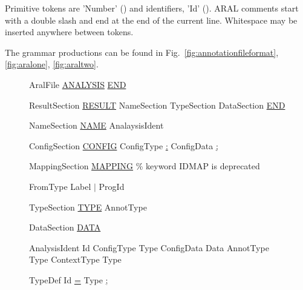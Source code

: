{Primitive tokens are 'Number' () and identifiers, 'Id' ().
ARAL comments start with a double slash and end at the end of the current line. Whitespace may be inserted anywhere between tokens.

The grammar productions can be found in Fig.~\ref{fig:annotationfileformat},\ref{fig:aralone}, \ref{fig:araltwo}.

\begin{figure}[!ht]
\begin{GRAMMAR}
{AralFile}      \>\>\>\>\>\garrow\> \underline{ANALYSIS} 
                 \>\>\>\>\> \> 
                 \>\>\>\>\> \>  
                 \>\>\>\>\> \>  
                 \>\>\>\>\> \>       \underline{END}

{ResultSection}    \>\>\>\>\>\garrow\> \underline{RESULT}
                 \>\>\>\>\> \> NameSection
                 \>\>\>\>\> \> TypeSection 
                 \>\>\>\>\> \> DataSection 
                 \>\>\>\>\> \> \underline{END}

{NameSection}    \>\>\>\>\>\garrow\> \underline{NAME} AnalaysisIdent

{ConfigSection}  \>\>\>\>\>\garrow\> \underline{CONFIG} ConfigType \underline{:} ConfigData \underline{;}

{MappingSection}  \>\>\>\>\>\>\garrow\> \underline{MAPPING}  
                  \>\>\>\>\>\>\% keyword IDMAP is deprecated

{FromType}       \>\>\>\>\>\garrow\> Label
                 \>\>\>\>\> \> $\mid$ ProgId

{TypeSection}    \>\>\>\>\>\garrow\> \underline{TYPE}   AnnotType 

{DataSection}    \>\>\>\>\>\garrow\> \underline{DATA} 

{AnalysisIdent}  \>\>\>\>\>\garrow\> Id
{ConfigType}     \>\>\>\>\>\garrow\> Type
{ConfigData}     \>\>\>\>\>\garrow\> Data
{AnnotType}      \>\>\>\>\>\garrow\> Type
{ContextType}    \>\>\>\>\>\garrow\> Type

{TypeDef}        \>\>\>\>\>\garrow\> Id \underline{=} Type \underline{;}


\end{GRAMMAR}
\end{figure}}

